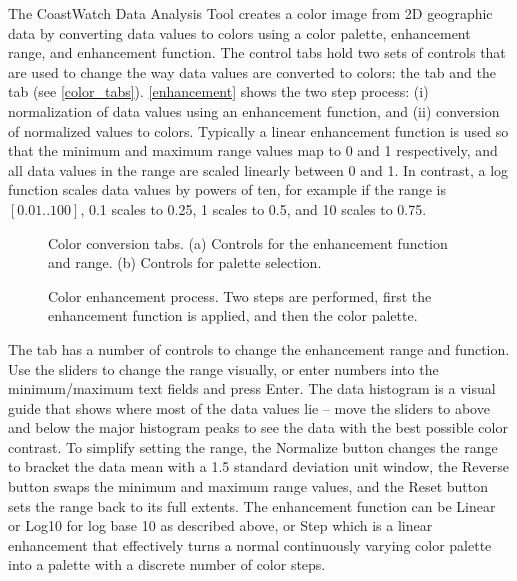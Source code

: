 The CoastWatch Data Analysis Tool creates a color image from 2D
geographic data by converting data values to colors using a color
palette, enhancement range, and enhancement function.  The
control tabs hold two sets of controls that are used to change
the way data values are converted to colors: the
 tab and the
 tab (see \autoref{color_tabs}).
\autoref{enhancement} shows the two step process: (i)
normalization of data values using an enhancement function, and
(ii) conversion of normalized values to colors.  Typically a
linear enhancement function is used so that the minimum and
maximum range values map to 0 and 1 respectively, and all data
values in the range are scaled linearly between 0 and 1.  In
contrast, a log function scales data values by powers of ten, for
example if the range is $[0.01..100]$, 0.1 scales to 0.25, 1
scales to 0.5, and 10 scales to 0.75.

\begin{figure}
  \begin{center}
    \caption[Color conversion tabs]{
       Color conversion tabs.  (a) Controls for the enhancement
       function and range.  (b) Controls for palette
       selection.
    }
    \label{color_tabs}
  \end{center}
\end{figure}

\begin{figure}
  \begin{center}
    \caption[Color enhancement process]{
       Color enhancement process.  Two steps are performed, first
       the enhancement function is applied, and then the color
       palette.
    }
    \label{enhancement}
  \end{center}
\end{figure}

The  tab has a number of
controls to change the enhancement range and function.  Use the
sliders to change the range visually, or enter numbers into the
minimum/maximum text fields and press Enter.  The data histogram
is a visual guide that shows where most of the data values lie --
move the sliders to above and below the major histogram peaks to
see the data with the best possible color contrast.  To simplify
setting the range, the {\gui Normalize} button changes the range
to bracket the data mean with a 1.5 standard deviation unit
window, the {\gui Reverse} button swaps the minimum and maximum
range values, and the {\gui Reset} button sets the range back to
its full extents.  The enhancement function can be {\gui Linear}
or {\gui Log10} for log base 10 as described above, or {\gui Step}
which is a linear enhancement that effectively turns a normal
continuously varying color palette into a palette with a discrete
number of color steps.

